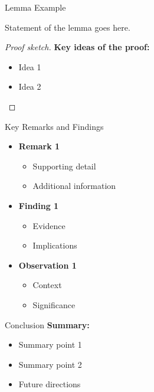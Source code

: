 \documentclass{beamer}
\begin{document}
\begin{frame}{Lemma Example}
\begin{lemma}
Statement of the lemma goes here.
\end{lemma}

\begin{proof}[Proof sketch]
\textbf{Key ideas of the proof:}
\begin{itemize}
\item Idea 1
\item Idea 2
\end{itemize}
\end{proof}
\end{frame}

\begin{frame}{Key Remarks and Findings}
\begin{itemize}
\item \textbf{Remark 1}
    \begin{itemize}
    \item Supporting detail
    \item Additional information
    \end{itemize}
\item \textbf{Finding 1}
    \begin{itemize}
    \item Evidence
    \item Implications
    \end{itemize}
\item \textbf{Observation 1}
    \begin{itemize}
    \item Context
    \item Significance
    \end{itemize}
\end{itemize}
\end{frame}

\begin{frame}{Conclusion}
\textbf{Summary:}
\begin{itemize}
\item Summary point 1
\item Summary point 2
\item Future directions
\end{itemize}
\end{frame}
\end{document}
